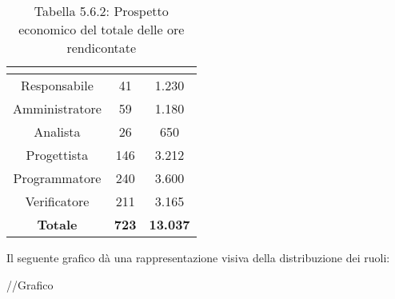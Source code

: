 \renewcommand{\arraystretch}{1.5}
\begin{table}[H]
\begin{center}
\begin{tabular}{|c|c|c|}
\hline
\rowcolor{title_row}
\textbf{\color{title_text}{Ruolo}}  & \textbf{\color{title_text}{Ore}} & \textbf{\color{title_text}{Costo in \euro}} \\ \hline
Responsabile    & 41 & 1.230  \\ \hline
Amministratore  & 59 & 1.180 \\ \hline
Analista        & 26 & 650 \\ \hline
Progettista     & 146 & 3.212 \\ \hline
Programmatore   & 240 & 3.600 \\ \hline
Verificatore    & 211 & 3.165 \\ \hline
\textbf{Totale} & \textbf{723}    & \textbf{13.037}           \\ \hline
\end{tabular}
\caption{Tabella 5.6.2: Prospetto economico del totale delle ore rendicontate\label{}}
\end{center}
\end{table}
\renewcommand{\arraystretch}{1}

Il seguente grafico dà una rappresentazione visiva della distribuzione dei ruoli: \\
\begin{center}
//Grafico
\end{center}


\pagebreak